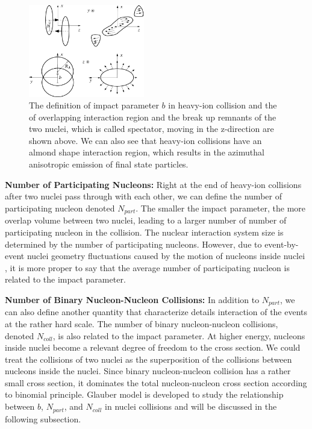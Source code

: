 \begin{figure}[hbtp]
\begin{center}
\includegraphics[width=0.45\textwidth]{Figures/Chapter1/IPHIColl.png}
\caption{The definition of impact parameter $b$ in heavy-ion collision and the of overlapping interaction region and the break up remnants of the two nuclei, which is called spectator, moving in the z-direction are shown above. We can also see that heavy-ion collisions have an almond shape interaction region, which results in the azimuthal anisotropic emission of final state particles.}
\label{IPHIColl}
\end{center}
\end{figure} 


\textbf{Number of Participating Nucleons:} Right at the end of heavy-ion collisions after two nuclei pass through with each other, we can define the number of participating nucleon denoted $N_{part}$. The smaller the impact parameter, the more overlap volume between two nuclei, leading to a larger number of number of participating nucleon in the collision. The nuclear interaction system size is determined by the number of participating nucleons. However, due to event-by-event nuclei geometry fluctuations caused by the motion of nucleons inside nuclei \cite{GuntherV3}, it is more proper to say that the average number of participating nucleon is related to the impact parameter.

\textbf{Number of Binary Nucleon-Nucleon Collisions:} In addition to $N_{part}$, we can also define another quantity that characterize details interaction of the events at the rather hard scale. The number of binary nucleon-nucleon collisions, denoted $N_{coll}$, is also related to the impact parameter. At higher energy, nucleons inside nuclei become a relevant degree of freedom to the cross section. We could treat the collisions of two nuclei as the superposition of the collisions between nucleons inside the nuclei. Since binary nucleon-nucleon collision has a rather small cross section, it dominates the total nucleon-nucleon cross section according to binomial principle. Glauber model is developed to study the relationship between $b$, $N_{part}$, and $N_{coll}$ in nuclei collisions and will be discussed in the following subsection.


